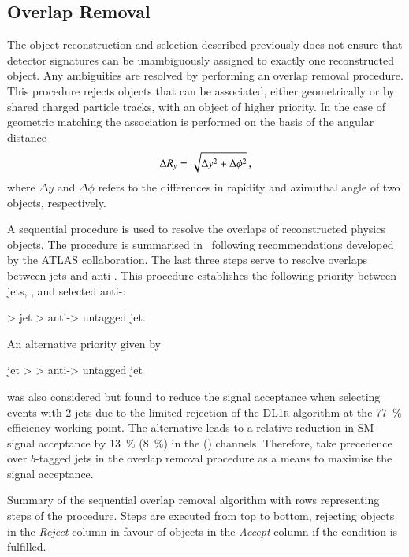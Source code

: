 \subsection{Overlap Removal}%
\label{sec:overlap_removal}

The object reconstruction and selection described previously does not ensure
that detector signatures can be unambiguously assigned to exactly one
reconstructed object. Any ambiguities are resolved by performing an overlap
removal procedure. This procedure rejects objects that can be associated, either
geometrically or by shared charged particle tracks, with an object of higher
priority. In the case of geometric matching the association is performed on the
basis of the angular distance
\begin{align*}
  \Delta R_y = \sqrt{\Delta y^2 + \Delta \phi^2} \,\text{,}
\end{align*}
where $\Delta y$ and $\Delta \phi$ refers to the differences in rapidity and
azimuthal angle of two objects, respectively.

A sequential procedure is used to resolve the overlaps of reconstructed physics
objects. The procedure is summarised in~ following
recommendations developed by the ATLAS collaboration. The last three steps serve
to resolve overlaps between jets and anti-\tauhadvis. This procedure establishes
the following priority between jets, \tauhadvis, and selected anti-\tauhadvis:
\begin{center}
  \tauhadvis > \btagged jet > anti-\tauhadvis > untagged jet.
\end{center}
An alternative priority given by
\begin{center}
  \btagged jet > \tauhadvis > anti-\tauhadvis > untagged jet
\end{center}
was also considered but found to reduce the signal acceptance when selecting
events with 2 \btagged jets due to the limited \tauhadvis rejection of the
\textsc{DL1r} \btag algorithm at the \SI{77}{\percent} efficiency working
point. The alternative leads to a relative reduction in SM \HH signal acceptance
by \SI{13}{\percent} (\SI{8}{\percent}) in the \hadhad (\lephad)
channels. Therefore, \tauhadvis take precedence over $b$-tagged jets in the
overlap removal procedure as a means to maximise the signal acceptance.

\begin{table}[htbp]
  \centering


  \caption{Summary of the sequential overlap removal algorithm with rows
    representing steps of the procedure. Steps are executed from top to bottom,
    rejecting objects in the \emph{Reject} column in favour of objects in the
    \emph{Accept} column if the condition is fulfilled.}%
  \label{tab:overlap_removal}

  \resizebox{\textwidth}{!}{%
    
  }
\end{table}


